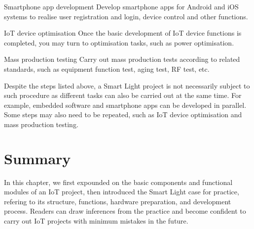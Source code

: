 \documentclass[a4paper,12pt]{book}
\begin{document}
\begin{term}{Smartphone app development}
    Develop smartphone apps for Android and iOS systems to realise user registration and login, device control and other functions.
\end{term}

\begin{term}{IoT device optimisation}
    Once the basic development of IoT device functions is completed, you may turn to optimisation tasks, such as power optimisation.
\end{term}

\begin{term}{Mass production testing}
    Carry out mass production tests according to related standards, such as equipment function test, aging test, RF test, etc.
\end{term}

Despite the steps listed above, a Smart Light project is not necessarily subject to such procedure as different tasks can also be carried out at the same time. For example, embedded software and smartphone apps can be developed in parallel. Some steps may also need to be repeated, such as IoT device optimisation and mass production testing.

\section{Summary}
In this chapter, we first expounded on the basic components and functional modules of an IoT project, then introduced the Smart Light case for practice, refering to its structure, functions, hardware preparation, and development process. Readers can draw inferences from the practice and become confident to carry out IoT projects with minimum mistakes in the future.
\end{document}
